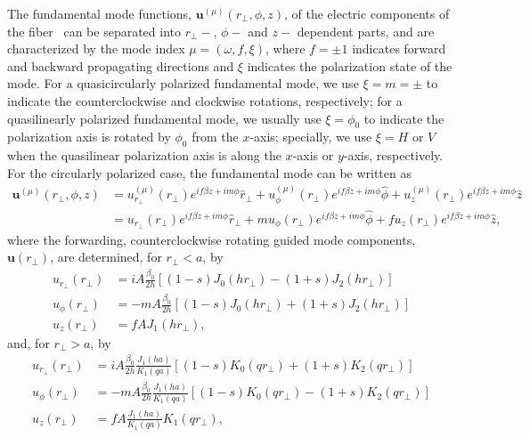 \documentclass[preprint,aps,pra,onecolumn]{revtex4-1} %
\begin{document}
The fundamental mode functions, $\mathbf{u}^{(\mu)}(r\!_\perp,\phi,z)$, of the electric components of the fiber~\cite{LeKien2005,Lacroute2012} can be separated into $r\!_\perp-$, $\phi-$ and $z-$ dependent parts, and are characterized by the mode index $\mu=(\omega,f,\xi)$, where $f=\pm 1$ indicates forward and backward propagating directions and $\xi $ indicates the polarization state of the mode. For a quasicircularly polarized fundamental mode, we use $\xi=m=\pm $ to indicate the counterclockwise and clockwise rotations, respectively; for a quasilinearly polarized fundamental mode, we usually use $\xi=\phi_0$ to indicate the polarization axis is rotated by $\phi_0$ from the $x$-axis; specially, we use $\xi=H$ or $V$ when the quasilinear polarization axis is along the $x$-axis or $y$-axis, respectively. For the circularly polarized case, the fundamental mode can be written as 
\begin{align}
\mathbf{u}^{(\mu)}(r\!_\perp,\phi,z) &=u^{(\mu)}_{r\!_\perp}(r\!_\perp) e^{if\beta z+im\phi }\hat{r}\!_\perp +u^{(\mu)}_{\phi}(r\!_\perp) e^{if\beta z+im\phi } \hat{\phi} +u^{(\mu)}_{z}(r\!_\perp)e^{if\beta z+im\phi }\hat{z}\\
&=u_{r\!_\perp}(r\!_\perp) e^{if\beta z+im\phi }\hat{r}\!_\perp + m u_{\phi}(r\!_\perp) e^{if\beta z+im\phi }\hat{\phi} + f u_z (r\!_\perp) e^{if\beta z+im\phi }\hat{z},
\end{align}
where the forwarding, counterclockwise rotating guided mode components, $\mathbf{u}(r\!_\perp)$, are determined, for $r\!_\perp<a$, by
\begin{subequations}
\label{urtcrla}
\begin{align}
u_{r\!_\perp}(r\!_\perp) &=iA\frac{\beta_0}{2h} \left[ (1-s)J_0(hr\!_\perp)-(1+s)J_2(hr\!_\perp) \right]\\
u_\phi(r\!_\perp) &=  -mA \frac{\beta_0}{2h} \left[ (1-s)J_0(hr\!_\perp) +(1+s)J_2(hr\!_\perp) \right] \\
u_z(r\!_\perp) &= fA J_1(hr\!_\perp),
\end{align}
\end{subequations}
and, for $ r_\perp>a $, by
\begin{subequations}
\label{urtcrga}
\begin{align}
u_{r\!_\perp}(r\!_\perp) &=iA\frac{\beta_0}{2h}\frac{J_1(ha)}{K_1(qa)} \left[ (1-s)K_0(qr\!_\perp)+(1+s)K_2(qr\!_\perp) \right]\\
u_\phi(r\!_\perp) &=  -mA \frac{\beta_0}{2h} \frac{J_1(ha)}{K_1(qa)} \left[ (1-s)K_0(qr\!_\perp) - (1+s)K_2(qr\!_\perp) \right] \\
u_z(r\!_\perp) &= fA \frac{J_1(ha)}{K_1(qa)} K_1(qr\!_\perp),
\end{align}
\end{subequations}
\end{document}
